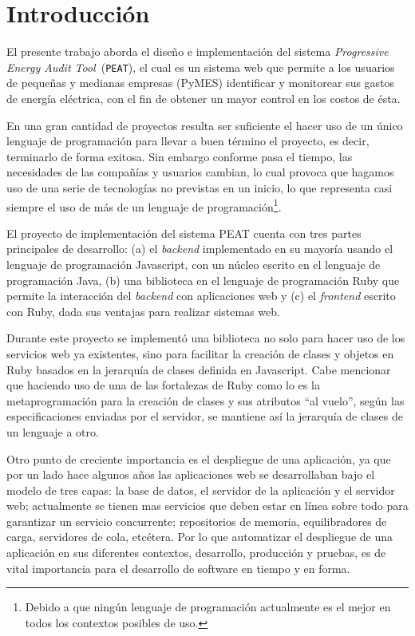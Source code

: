 \chapter*{Introducción}
El presente trabajo aborda el diseño e implementación del sistema \textit{Progressive
  Energy Audit Tool}\ (\texttt{PEAT}), el cual es un sistema web que permite
a los usuarios de pequeñas y medianas empresas (PyMES) identificar y monitorear
sus gastos de energía eléctrica, con el fin de obtener un mayor control
en los costos de ésta.

En una gran cantidad de proyectos resulta ser suficiente el hacer uso de un
único lenguaje de programación para llevar a buen término el proyecto, es decir,
terminarlo de forma exitosa. Sin embargo conforme pasa el tiempo, las necesidades
de las compañías y usuarios cambian, lo cual provoca que hagamos uso de una serie de
tecnologías no previstas en un inicio, lo que representa casi siempre el uso
de más de un lenguaje de programación\footnote{Debido a que ningún
lenguaje de programación actualmente es el mejor en todos los contextos
posibles de uso.}.

El proyecto de implementación del sistema PEAT cuenta con tres partes principales
de desarrollo: (a) el \textit{backend}  implementado en su mayoría usando
el lenguaje de programación Javascript, con un núcleo escrito en el lenguaje de
programación Java, (b) una biblioteca en el lenguaje de programación Ruby que permite
la interacción del \textit{backend} con aplicaciones web y (c) el \textit{frontend}
escrito con Ruby, dada sus ventajas para realizar sistemas web.

Durante este proyecto se implementó una biblioteca no solo para hacer uso de
los servicios web ya existentes, sino para facilitar la creación
de clases y objetos en Ruby basados en la jerarquía de clases definida
en Javascript. Cabe mencionar que haciendo uso de una de las fortalezas de Ruby
como lo es la metaprogramación para la creación de clases y sus
atributos ``al vuelo'', según las especificaciones enviadas por el servidor,
se mantiene así la jerarquía de clases de un lenguaje a otro.

Otro punto de creciente importancia es el despliegue de una aplicación, ya que por un
lado hace algunos años las aplicaciones web se desarrollaban bajo el modelo de
tres capas: la base de datos, el servidor de la aplicación y el servidor web;
actualmente se tienen mas servicios que deben estar en línea sobre todo para
garantizar un servicio concurrente; repositorios de memoria, equilibradores de carga,
servidores de cola, etcétera. Por lo que automatizar el despliegue de una aplicación
en sus diferentes contextos, desarrollo, producción y pruebas, es de vital
importancia para el desarrollo de software en tiempo y en forma.


